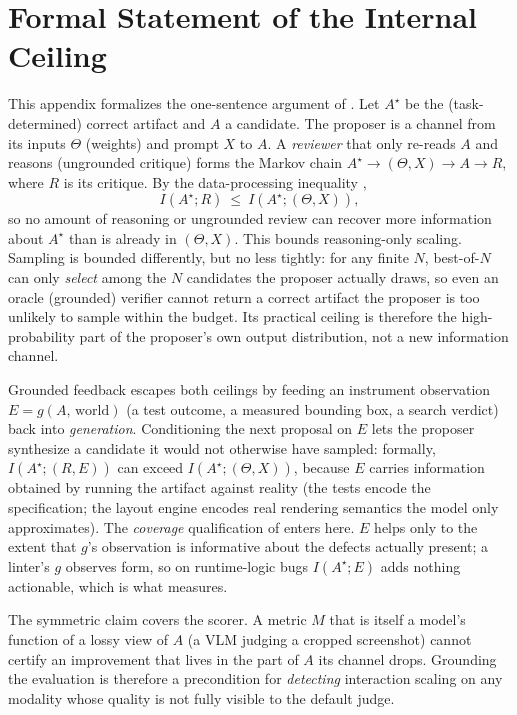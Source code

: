 \appendix
\section{Formal Statement of the Internal Ceiling}
\label{app:ceiling}

This appendix formalizes the one-sentence argument of . Let $A^\star$ be the (task-determined) correct artifact and $A$ a candidate. The proposer is a channel from its inputs $\Theta$ (weights) and prompt $X$ to $A$. A \emph{reviewer} that only re-reads $A$ and reasons (ungrounded critique) forms the Markov chain $A^\star \to (\Theta,X) \to A \to R$, where $R$ is its critique. By the data-processing inequality \citep{cover2006elements},
\[
I(A^\star; R)\ \le\ I(A^\star; (\Theta,X)),
\]
so no amount of reasoning or ungrounded review can recover more information about $A^\star$ than is already in $(\Theta,X)$. This bounds reasoning-only scaling. Sampling is bounded differently, but no less tightly: for any finite $N$, best-of-$N$ can only \emph{select} among the $N$ candidates the proposer actually draws, so even an oracle (grounded) verifier cannot return a correct artifact the proposer is too unlikely to sample within the budget. Its practical ceiling is therefore the high-probability part of the proposer's own output distribution, not a new information channel.

Grounded feedback escapes both ceilings by feeding an instrument observation $E=g(A,\,\mathrm{world})$ (a test outcome, a measured bounding box, a search verdict) back into \emph{generation}. Conditioning the next proposal on $E$ lets the proposer synthesize a candidate it would not otherwise have sampled: formally, $I(A^\star;(R,E))$ can exceed $I(A^\star;(\Theta,X))$, because $E$ carries information obtained by running the artifact against reality (the tests encode the specification; the layout engine encodes real rendering semantics the model only approximates). The \emph{coverage} qualification of  enters here. $E$ helps only to the extent that $g$'s observation is informative about the defects actually present; a linter's $g$ observes form, so on runtime-logic bugs $I(A^\star;E)$ adds nothing actionable, which is what  measures.

The symmetric claim covers the scorer. A metric $M$ that is itself a model's function of a lossy view of $A$ (a VLM judging a cropped screenshot) cannot certify an improvement that lives in the part of $A$ its channel drops. Grounding the evaluation is therefore a precondition for \emph{detecting} interaction scaling on any modality whose quality is not fully visible to the default judge.

